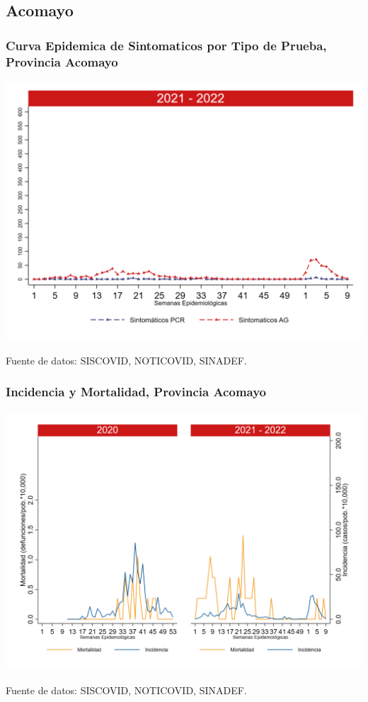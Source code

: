 \documentclass[xcolor=table]{beamer}
\begin{document}
\subsection{Acomayo}
\begin{frame}[label=Acomayo]
	\frametitle{Curva Epidemica de Sintomaticos por Tipo de Prueba, Provincia Acomayo}
	\vspace{-.5cm}
	\begin{center}
		\includegraphics[width=0.8\linewidth, trim={0cm .5cm 0cm 0.2cm},clip]{../figuras/sinto_prueba20_21_1.png}
	\end{center}
	{\tiny Fuente de datos: SISCOVID, NOTICOVID, SINADEF.}
	\hyperlink{TipoPrueba}{}
\end{frame}

\begin{frame}[label=Acomayo]
	\frametitle{Incidencia y Mortalidad, Provincia Acomayo}
	\vspace{-.5cm}
	\begin{center}
		\includegraphics[width=0.8\linewidth, trim={0cm .5cm 0cm 0.2cm},clip]{../figuras/incidencia_mortalidad_20_21_1.png}
	\end{center}
	{\tiny Fuente de datos: SISCOVID, NOTICOVID, SINADEF.}
\end{frame}
\end{document}
